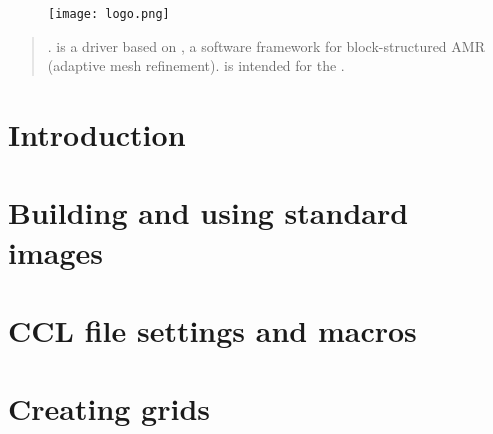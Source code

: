 \begin{figure*}[ht]
    \begin{center}
        \texttt{[image: logo.png]}
    \end{center}
    \label{fig:logo}
\end{figure*}

\newpage

\begin{abstract}

. \CarpetX\space is a \href{https://www.cactuscode.org/index.html}{\Cactus} driver based on \href{https://amrex-codes.github.io/}{\AMReX}, a software framework for block-structured AMR (adaptive mesh refinement). \CarpetX\space is intended for the \href{https://einsteintoolkit.org/}{\ETK}.

\end{abstract}

\newpage

\tableofcontents

\newpage


\section{Introduction}
\label{sec:intro}


\section{Building and using standard images}
\label{sec:std_imgs}

\section{CCL file settings and macros}
\label{sec:ccl_files}


\section{Creating grids}
\label{sec:grids}


